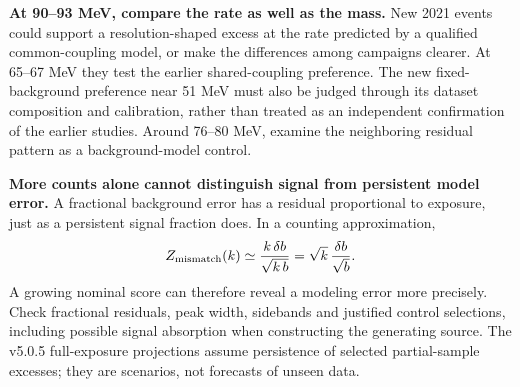 \documentclass[11pt]{article}
\begin{document}
\textbf{At 90--93 MeV, compare the rate as well as the mass.} New 2021 events could support a resolution-shaped excess at the rate predicted by a qualified common-coupling model, or make the differences among campaigns clearer. At 65--67 MeV they test the earlier shared-coupling preference. The new fixed-background preference near 51 MeV must also be judged through its dataset composition and calibration, rather than treated as an independent confirmation of the earlier studies. Around 76--80 MeV, examine the neighboring residual pattern as a background-model control.

\textbf{More counts alone cannot distinguish signal from persistent model error.} A fractional background error has a residual proportional to exposure, just as a persistent signal fraction does. In a counting approximation,
\[
 Z_{\rm mismatch}(k)\simeq\frac{k\,\delta b}{\sqrt{k\,b}}
 =\sqrt{k}\,\frac{\delta b}{\sqrt b}.
\]
A growing nominal score can therefore reveal a modeling error more precisely. Check fractional residuals, peak width, sidebands and justified control selections, including possible signal absorption when constructing the generating source. The v5.0.5 full-exposure projections assume persistence of selected partial-sample excesses; they are scenarios, not forecasts of unseen data.

\vfill
{}
\end{document}
